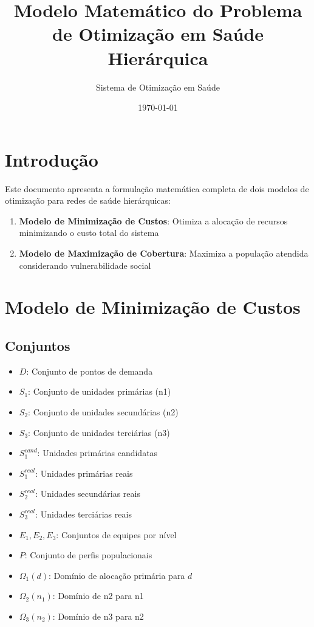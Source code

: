 \documentclass{article}
\title{Modelo Matemático do Problema de Otimização em Saúde Hierárquica}
\author{Sistema de Otimização em Saúde}
\date{\today}
\begin{document}
\maketitle

\section{Introdução}

Este documento apresenta a formulação matemática completa de dois modelos de otimização para redes de saúde hierárquicas:

\begin{enumerate}
    \item \textbf{Modelo de Minimização de Custos}: Otimiza a alocação de recursos minimizando o custo total do sistema
    \item \textbf{Modelo de Maximização de Cobertura}: Maximiza a população atendida considerando vulnerabilidade social
\end{enumerate}

\section{Modelo de Minimização de Custos}

\subsection{Conjuntos}

\begin{itemize}
    \item $D$: Conjunto de pontos de demanda
    \item $S_1$: Conjunto de unidades primárias (n1)
    \item $S_2$: Conjunto de unidades secundárias (n2)
    \item $S_3$: Conjunto de unidades terciárias (n3)
    \item $S_1^{cand}$: Unidades primárias candidatas
    \item $S_1^{real}$: Unidades primárias reais
    \item $S_2^{real}$: Unidades secundárias reais
    \item $S_3^{real}$: Unidades terciárias reais
    \item $E_1, E_2, E_3$: Conjuntos de equipes por nível
    \item $P$: Conjunto de perfis populacionais
    \item $\Omega_1(d)$: Domínio de alocação primária para $d$
    \item $\Omega_2(n_1)$: Domínio de n2 para n1
    \item $\Omega_3(n_2)$: Domínio de n3 para n2
\end{itemize}
\end{document}

